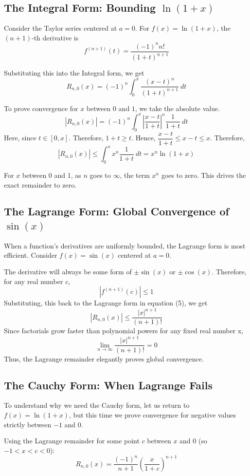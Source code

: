 \documentclass[12pt, a4paper]{article}
\theoremstyle{definition}
\theoremstyle{remark}
\begin{document}
\subsection{The Integral Form: Bounding $\ln(1+x)$}
Consider the Taylor series centered at $a=0$. For $f(x) = \ln(1+x)$, the $(n+1)$-th derivative is\[f^{(n+1)}(t) = \frac{(-1)^nn!}{(1+t)^{n+1}}\]

Substituting this into the Integral form, we get
\[
R_{n,0}(x) = (-1)^n \int_0^x \frac{(x-t)^n}{(1+t)^{n+1}} \ dt
\]

To prove convergence for $x$ between $0$ and $1$, we take the absolute value.
\[
\left|R_{n,0}(x)\right| = (-1)^n \int_0^x \left|\frac{x-t}{1+t}\right|^n \frac{1}{1+t} \ dt
\]
Here, since $t \in [0, x]$. Therefore, $1+t \ge t$. Hence, $\dfrac{x-t}{1+t} \le x-t \le x$. Therefore, \[\left|R_{n,0}(x)\right| \le \int_0^x x^n \frac{1}{1+t} \ dt = x^n \ln(1+x)\]

For $x$ between 0 and 1, as $n$ goes to $\infty$, the term $x^n$ goes to zero. This drives the exact remainder to zero.

\subsection{The Lagrange Form: Global Convergence of $\sin(x)$}
When a function's derivatives are uniformly bounded, the Lagrange form is most efficient. Consider $f(x) = \sin(x)$ centered at $a=0$.

The derivative will always be some form of $\pm \sin(x)$ or $\pm \cos(x)$. Therefore, for any real number $c$,\[ |f^{(n+1)}(c)| \le 1\]
Substituting, this back to the Lagrange form in equation (5), we get
\[
|R_{n,0}(x)| \le \frac{|x|^{n+1}}{(n+1)!}
\]
Since factorials grow faster than polynomial powers for any fixed real number x,
\[
\lim_{n \to \infty} \frac{|x|^{n+1}}{(n+1)!} = 0
\]Thus, the Lagrange remainder elegantly proves global convergence.

\subsection{The Cauchy Form: When Lagrange Fails}
To understand why we need the Cauchy form, let us return to $f(x) = \ln(1+x)$, but this time we prove convergence for negative values strictly between $-1$ and $0$.

Using the Lagrange remainder for some point $c$ between $x$ and $0$ (so $-1 < x < c < 0$):
\begin{equation*}
    R_{n,0}(x) = \frac{(-1)^n}{n+1} \left(\frac{x}{1+c}\right)^{n+1}
\end{equation*}
\end{document}

